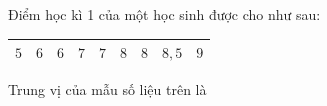 \begin{ex}
Điểm học kì 1 của một học sinh được cho như sau:
\begin{center}
\begin{tabular}{|c|c|c|c|c|c|c|c|c|}\hline
$5$ & $6$ & $6$ & $7$ & $7$ & $8$ & $8$ & $8{,}5$ & $9$\\\hline
\end{tabular}
\end{center}
Trung vị của mẫu số liệu trên là
\end{ex}

